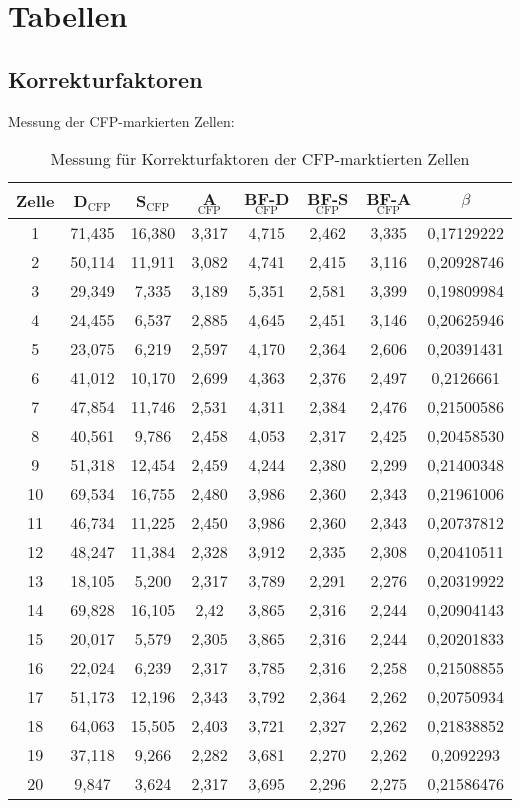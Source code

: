 \chapter{Tabellen}
\section{Korrekturfaktoren}
Messung der CFP-markierten Zellen:
\begin{table}[htbp]
    \centering    
      \begin{tabular}{c|ccccccc}
        Zelle & D$_\text{CFP}$ & S$_\text{CFP}$ & A$_\text{CFP}$ & BF-D$_\text{CFP}$ & BF-S$_\text{CFP}$ & BF-A$_\text{CFP}$ & $\beta$\\\hline
      1 & 71,435 & 16,380 & 3,317 & 4,715 & 2,462 & 3,335 & 0,17129222 \\
      2 & 50,114 & 11,911 & 3,082 & 4,741 & 2,415 & 3,116 & 0,20928746 \\
      3 & 29,349 & 7,335 & 3,189 & 5,351 & 2,581 & 3,399 & 0,19809984 \\
      4 & 24,455 & 6,537 & 2,885 & 4,645 & 2,451 & 3,146 & 0,20625946 \\
      5 & 23,075 & 6,219 & 2,597 & 4,170 & 2,364 & 2,606 & 0,20391431 \\
      6 & 41,012 & 10,170 & 2,699 & 4,363 & 2,376 & 2,497 & 0,2126661 \\
      7 & 47,854 & 11,746 & 2,531 & 4,311 & 2,384 & 2,476 & 0,21500586 \\
      8 & 40,561 & 9,786 & 2,458 & 4,053 & 2,317 & 2,425 & 0,20458530 \\
      9 & 51,318 & 12,454 & 2,459 & 4,244 & 2,380 & 2,299 & 0,21400348 \\
      10 & 69,534 & 16,755 & 2,480 & 3,986 & 2,360 & 2,343 & 0,21961006 \\
      11 & 46,734 & 11,225 & 2,450 & 3,986 & 2,360 & 2,343 & 0,20737812 \\
      12 & 48,247 & 11,384 & 2,328 & 3,912 & 2,335 & 2,308 & 0,20410511 \\
      13 & 18,105 & 5,200 & 2,317 & 3,789 & 2,291 & 2,276 & 0,20319922 \\
      14 & 69,828 & 16,105 & 2,42 & 3,865 & 2,316 & 2,244 & 0,20904143 \\
      15 & 20,017 & 5,579 & 2,305 & 3,865 & 2,316 & 2,244 & 0,20201833 \\
      16 & 22,024 & 6,239 & 2,317 & 3,785 & 2,316 & 2,258 & 0,21508855 \\
      17 & 51,173 & 12,196 & 2,343 & 3,792 & 2,364 & 2,262 & 0,20750934 \\
      18 & 64,063 & 15,505 & 2,403 & 3,721 & 2,327 & 2,262 & 0,21838852 \\
      19 & 37,118 & 9,266 & 2,282 & 3,681 & 2,270 & 2,262 & 0,2092293 \\
      20 & 9,847 & 3,624 & 2,317 & 3,695 & 2,296 & 2,275 & 0,21586476
      \end{tabular}
      \caption{Messung für Korrekturfaktoren der CFP-marktierten Zellen}
  \end{table}\newpage
